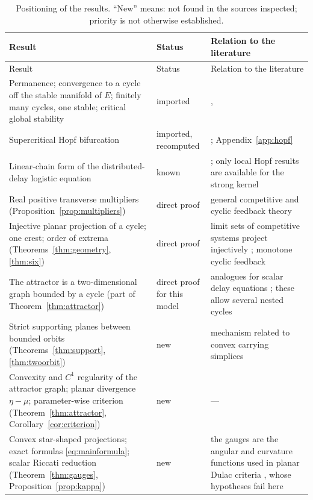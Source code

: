 {\small
\begin{longtable}{p{}p{}p{}}
\caption{Positioning of the results. ``New'' means: not found in the sources inspected; priority is not otherwise established.}\label{tab:positioning}\\
\toprule
Result & Status & Relation to the literature\\
\midrule
\endfirsthead
\toprule
Result & Status & Relation to the literature\\
\midrule
\endhead
\bottomrule
\endfoot
Permanence; convergence to a cycle off the stable manifold of $E$; finitely many cycles, one stable; critical global stability & imported & \cite{Smith12}, \cite[Theorem 13]{BH23}\\
Supercritical Hopf bifurcation & imported, recomputed & \cite{WH96}; Appendix~\ref{app:hopf}\\
Linear-chain form of the distributed-delay logistic equation & known & \cite{Ruan06}; only local Hopf results are available for the strong kernel\\
\midrule
Real positive transverse multipliers (Proposition~\ref{prop:multipliers}) & direct proof & general competitive and cyclic feedback theory \cite{MPS90}\\
Injective planar projection of a cycle; one crest; order of extrema (Theorems~\ref{thm:geometry}, \ref{thm:six}) & direct proof & limit sets of competitive systems project injectively \cite{Hirsch82}; monotone cyclic feedback \cite{MPS90}\\
The attractor is a two-dimensional graph bounded by a cycle (part of Theorem~\ref{thm:attractor}) & direct proof for this model & analogues for scalar delay equations \cite{Walther95}; these allow several nested cycles\\
\midrule
Strict supporting planes between bounded orbits (Theorems~\ref{thm:support}, \ref{thm:twoorbit}) & new & mechanism related to convex carrying simplices \cite{Baigent13}\\
Convexity and $C^1$ regularity of the attractor graph; planar divergence $\eta-\mu$; parameter-wise criterion (Theorem~\ref{thm:attractor}, Corollary~\ref{cor:criterion}) & new & ---\\
Convex star-shaped projections; exact formulas \eqref{eq:mainformula}; scalar Riccati reduction (Theorem~\ref{thm:gauges}, Proposition~\ref{prop:kappa}) & new & the gauges are the angular and curvature functions used in planar Dulac criteria \cite{GG21}, whose hypotheses fail here\\

\end{longtable}}
